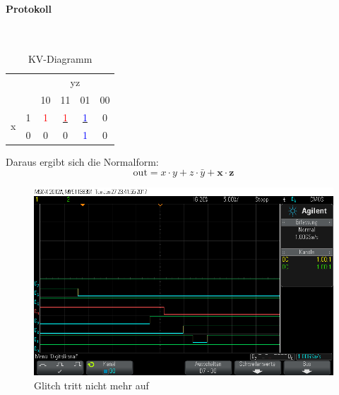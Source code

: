 \documentclass[10pt]{scrreprt}
\begin{document}
    \paragraph{Protokoll}
    $ $

    \begin{table}[H]
        \centering
        \begin{tabular}{cc|cccc}
            & &  & \multicolumn{2}{c}{yz}\\
            & & 10 & 11 & 01 & 00\\
            \midrule
            \multirow{ 2}{*}{x} & 1 & \textcolor{red}{1} & \underline{\textcolor{red}{1}} & \underline{\textcolor{blue}{1}} & 0\\
             & 0 & 0 & 0 & \textcolor{blue}{1} & 0\\
        \end{tabular}
        \caption{KV-Diagramm}
    \end{table}

    Daraus ergibt sich die Normalform:
    \begin{equation*}
        \text{out} = x \cdot y + z \cdot \bar{y} + \mathbf{x \cdot z}
    \end{equation*}

    \begin{figure}[H]
        \includegraphics[width=\textwidth]{scope_13.png}
        \caption{Glitch tritt nicht mehr auf}
    \end{figure}
\end{document}

